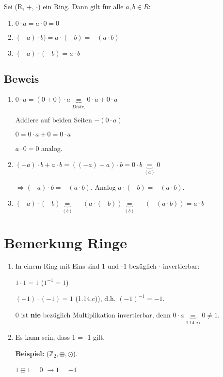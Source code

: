 \documentclass[a4paper, openany]{book}
\begin{document}
  Sei (R, +, $\cdot$) ein Ring. Dann gilt für alle $a,b \in R$:

  \begin{enumerate}[label=(\alph*)]
    \item $0 \cdot a = a \cdot 0 = 0$
    \item $(-a) \cdot b) = a \cdot (-b) = - (a \cdot b)$
    \item $(-a) \cdot (-b) = a \cdot b$
  \end{enumerate}

  \subsection{Beweis}

  \begin{enumerate}[label=(\alph*)]
    \item $0 \cdot a = (0+0) \cdot a \underbrace{=}_{Distr.} 0 \cdot a + 0 \cdot a$

    Addiere auf beiden Seiten $-(0 \cdot a)$

    $0 = 0 \cdot a +0 = 0 \cdot a$

    $a \cdot 0 = 0$ analog.

    \item $(-a) \cdot b + a \cdot b = ((-a) + a) \cdot b = 0 \cdot b \underbrace{=}_{(a)} 0$

    $\Rightarrow (-a) \cdot b = - (a \cdot b)$. Analog $a \cdot (-b) = - (a \cdot b)$.

    \item $(-a) \cdot (-b) \underbrace{=}_{(b)} - (a \cdot (-b)) \underbrace{=}_{(b)} - (- (a \cdot b)) = a \cdot b$
  \end{enumerate}

  \section{Bemerkung Ringe}

  \begin{enumerate}[label=(\alph*)]
    \item In einem Ring mit Eins sind 1 und -1 bezüglich $\cdot$ invertierbar:

    $1 \cdot 1 = 1$  ($1^{-1} = 1$) 

    $(-1) \cdot (-1) = 1$  (1.14.c)), d.h. $(-1)^{-1} = -1$.

    0 ist \textbf{nie} bezüglich Multiplikation invertierbar, denn $0 \cdot a \underbrace{=}_{1.14.a)} 0 \neq 1$.

    \item Es kann sein, dass 1 = -1 gilt.

    \textbf{Beispiel:} ($\mathbb{Z}_2, \oplus, \odot$).

    $1 \oplus 1 = 0$ $\rightarrow 1 = -1$
  \end{enumerate}
\end{document}
